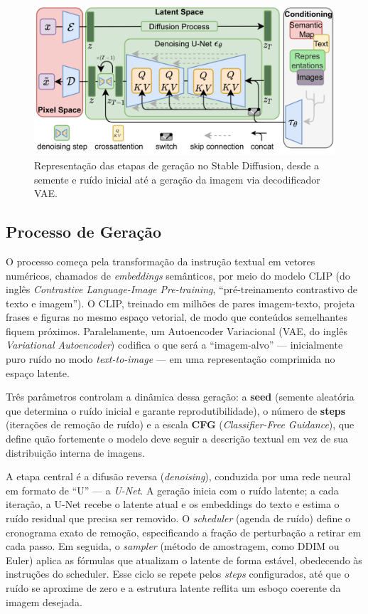 \documentclass[12pt, %
openright, 
oneside, %
a4paper,    %
brazil]{facom-ufu-abntex2}
\begin{document}
\begin{figure}[H]
    \centering
	\includegraphics[width=0.9\linewidth]{sdxl-flow.png}
	\caption[Diagrama do fluxo lógico dos modelos de difusão latente]{Representação das etapas de geração no Stable Diffusion, desde a semente e ruído inicial até a geração da imagem via decodificador VAE.}
	\label{fig:diagramaFluxoStableDiffusion}
\end{figure}

\subsection{Processo de Geração}

O processo começa pela transformação da instrução textual em vetores numéricos, chamados de \emph{embeddings} semânticos, por meio do modelo CLIP (do inglês \emph{Contrastive Language-Image Pre-training}, “pré-treinamento contrastivo de texto e imagem”). O CLIP, treinado em milhões de pares imagem-texto, projeta frases e figuras no mesmo espaço vetorial, de modo que conteúdos semelhantes fiquem próximos. Paralelamente, um Autoencoder Variacional (VAE, do inglês \emph{Variational Autoencoder}) codifica o que será a “imagem-alvo” — inicialmente puro ruído no modo \emph{text-to-image} — em uma representação comprimida no espaço latente.

Três parâmetros controlam a dinâmica dessa geração: a \textbf{seed} (semente aleatória que determina o ruído inicial e garante reprodutibilidade), o número de \textbf{steps} (iterações de remoção de ruído) e a escala \textbf{CFG} (\emph{Classifier-Free Guidance}), que define quão fortemente o modelo deve seguir a descrição textual em vez de sua distribuição interna de imagens.

A etapa central é a difusão reversa (\emph{denoising}), conduzida por uma rede neural em formato de “U” — a \emph{U-Net}. A geração inicia com o ruído latente; a cada iteração, a U-Net recebe o latente atual e os embeddings do texto e estima o ruído residual que precisa ser removido. O \emph{scheduler} (agenda de ruído) define o cronograma exato de remoção, especificando a fração de perturbação a retirar em cada passo. Em seguida, o \emph{sampler} (método de amostragem, como DDIM ou Euler) aplica as fórmulas que atualizam o latente de forma estável, obedecendo às instruções do scheduler. Esse ciclo se repete pelos \emph{steps} configurados, até que o ruído se aproxime de zero e a estrutura latente reflita um esboço coerente da imagem desejada.
\end{document}
